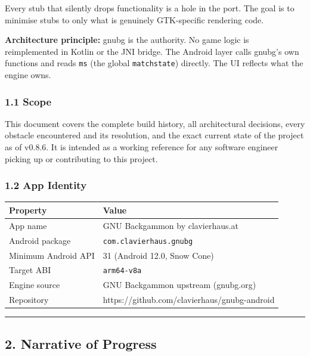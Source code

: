 \documentclass[11pt,a4paper]{article}
\begin{document}
Every stub that silently drops functionality is a hole in the port. The
goal is to minimise stubs to only what is genuinely GTK-specific
rendering code.

\textbf{Architecture principle:} gnubg is the authority. No game logic
is reimplemented in Kotlin or the JNI bridge. The Android layer calls
gnubg's own functions and reads \texttt{ms} (the global \texttt{matchstate})
directly. The UI reflects what the engine owns.

\subsubsection{1.1 Scope}\label{scope}

This document covers the complete build history, all architectural
decisions, every obstacle encountered and its resolution, and the exact
current state of the project as of v0.8.6. It is intended as a working
reference for any software engineer picking up or contributing to this
project.

\subsubsection{1.2 App Identity}\label{app-identity}

\begin{longtable}[]{@{}ll@{}}
\toprule\noalign{}
Property & Value \\
\midrule\noalign{}
\endhead
\bottomrule\noalign{}
\endlastfoot
App name & GNU Backgammon by clavierhaus.at \\
Android package & \texttt{com.clavierhaus.gnubg} \\
Minimum Android API & 31 (Android 12.0, Snow Cone) \\
Target ABI & \texttt{arm64-v8a} \\
Engine source & GNU Backgammon upstream (gnubg.org) \\
Repository & https://github.com/clavierhaus/gnubg-android \\
\end{longtable}

\begin{center}\rule{0.5\linewidth}{0.5pt}\end{center}

\subsection{2. Narrative of Progress}\label{narrative-of-progress}
\end{document}
